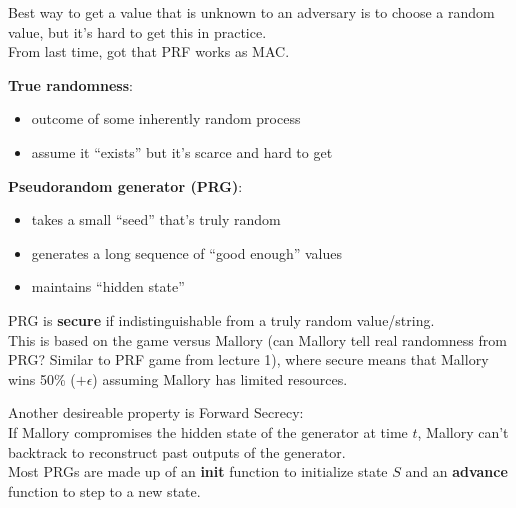 Best way to get a value that is unknown to an adversary is to choose a random
value, but it's hard to get this in practice.\\

From last time, got that PRF works as MAC.


{\bf True randomness}:
\begin{itemize}
    \item outcome of some inherently random process
    \item assume it ``exists'' but it's scarce and hard to get
\end{itemize}

{\bf Pseudorandom generator (PRG)}:
\begin{itemize}
    \item takes a small ``seed'' that's truly random
    \item generates a long sequence of ``good enough'' values
    \item maintains ``hidden state''
\end{itemize}

\begin{definition}
PRG is {\bf secure} if indistinguishable from a truly random
value/string.\\ This is based on the game versus Mallory (can Mallory
tell real randomness from PRG? Similar to PRF game from lecture 1),
where secure means that Mallory wins 50\% ($+\epsilon$) assuming
Mallory has limited resources.
\end{definition}

Another desireable property is Forward Secrecy:\\
If Mallory compromises the hidden state of the generator at time $t$, Mallory
can't backtrack to reconstruct past outputs of the generator.\\

Most PRGs are made up of an \textbf{init} function to initialize state
$S$ and an \textbf{advance} function to step to a new state.

